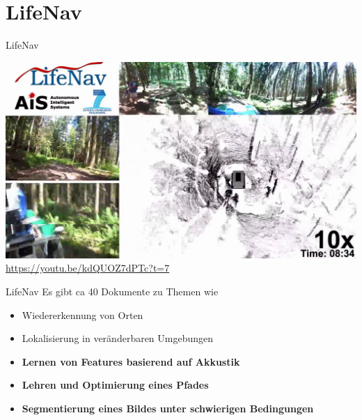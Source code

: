 \documentclass[aspectratio=1610]{beamer}
\begin{document}
  \section{LifeNav}
  \begin{frame}{LifeNav}
  	\begin{center}
  		\includegraphics[scale=0.15]{img/lifenav.png} \\
  		\url{https://youtu.be/kdQUOZ7dPTc?t=7}
  	\end{center}
  \end{frame}
  
  \begin{frame}{LifeNav}
  	Es gibt ca 40 Dokumente zu Themen wie
  	\begin{itemize}
  		\item Wiedererkennung von Orten
  		\pause
  		\item Lokalisierung in veränderbaren Umgebungen
  		\pause
  		\item \textbf{Lernen von Features basierend auf Akkustik}
  		\pause
  		\item \textbf{Lehren und Optimierung eines Pfades}
  		\pause
  		\item \textbf{Segmentierung eines Bildes unter schwierigen Bedingungen}
  	\end{itemize}
  \end{frame}
  
\end{document}
